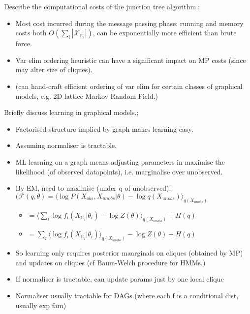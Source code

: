 \documentclass{article}
\begin{document}
Describe the computational costs of the junction tree algorithm.; \begin{itemize}
    \item Most cost incurred during the message passing phase: running and memory costs both $O(\sum_i|\mathcal{X}_{C_i}|)$, can be exponentially more efficient than brute force.
    \item Var elim ordering heuristic can have a significant impact on MP costs (since may alter size of cliques).
    \item (can hand-craft efficient ordering of var elim for certain classes of graphical models, e.g. 2D lattice Markov Random Field.)
\end{itemize}

Briefly discuss learning in graphical models.; \begin{itemize}
    \item Factorised structure implied by graph makes learning easy.
    \item Assuming normaliser is tractable.
    \item ML learning on a graph means adjusting parameters in maximise the likelihood (of observed datapoints), i.e. marginalise over unobserved.
    \item By EM, need to maximise (under q of unobserved): $\mathcal{(F}(q,\theta)=\langle \log P(X_{obs}, X_{unobs}|\theta) - \log q(X_{unobs})\rangle_{q(X_{unobs})}$
    \begin{itemize}
        \item $=\langle \sum_i\log f_i(X_{C_i}|\theta_i)-\log Z(\theta)\rangle_{q(X_{unobs})} + H(q)$
        \item $=\sum_i\langle \log f_i(X_{C_i}|\theta_i)\rangle_{q(X_{unobs})} -\log Z(\theta)+H(q)$
    \end{itemize}
    \item So learning only requires posterior maarginals on cliques (obtained by MP) and updates on cliques (cf Baum-Welch procedure for HMMs.)
    \item If normaliser is tractable, can update params just by one local clique
    \item Normaliser usually tractable for DAGs (where each f is a conditional dist, usually exp fam)
\end{itemize}
\end{document}
